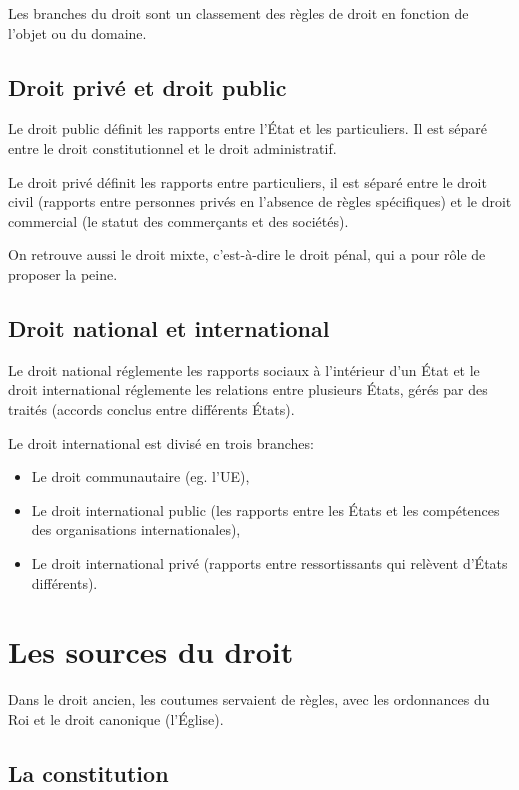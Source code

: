 \documentclass[10pt,a4paper]{article}
\begin{document}
Les branches du droit sont un classement des règles de droit en fonction de l'objet ou du domaine.

\subsection{Droit privé et droit public}

Le droit public définit les rapports entre l'État et les particuliers. Il est séparé entre le droit constitutionnel et le droit administratif.

Le droit privé définit les rapports entre particuliers, il est séparé entre le droit civil (rapports entre personnes privés en l'absence de règles spécifiques) et le droit commercial (le statut des commerçants et des sociétés).

On retrouve aussi le droit mixte, c'est-à-dire le droit pénal, qui a pour rôle de proposer la peine.

\subsection{Droit national et international}

Le droit national réglemente les rapports sociaux à l'intérieur d'un État et le droit international réglemente les relations entre plusieurs États, gérés par des traités (accords conclus entre différents États).

Le droit international est divisé en trois branches:
\begin{itemize}
\item Le droit communautaire (eg. l'UE),
\item Le droit international public (les rapports entre les États et les compétences des organisations internationales),
\item Le droit international privé (rapports entre ressortissants qui relèvent d'États différents).
\end{itemize}

\section{Les sources du droit}

Dans le droit ancien, les coutumes servaient de règles, avec les ordonnances du Roi et le droit canonique (l'Église).

\subsection{La constitution}
\end{document}
